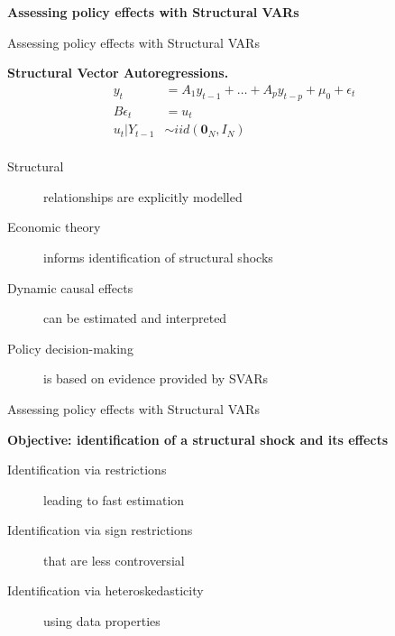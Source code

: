 \documentclass[notes,blackandwhite,mathsans]{beamer}
\begin{document}
{
\begin{frame}

\begin{adjustwidth}{-0.5cm}{0cm}
\vspace{8.3cm}\Large
\textbf{{\color{mcxs3}Assessing policy effects with  } {\color{mcxs1}Structural VARs}}
\end{adjustwidth}

\end{frame}
}





\begin{frame}{Assessing policy effects with Structural VARs}

\textbf{Structural Vector Autoregressions.}
\begin{align*}
y_t &= A_1 y_{t-1} + \dots + A_p y_{t-p}  + \mu_0 + \epsilon_t\\[1ex]
B\epsilon_t &= u_t \\[1ex]
u_t|Y_{t-1} &\sim iid\left(\mathbf{0}_N,I_N\right)\\
\end{align*}

\begin{description}
\item[Structural] {\color{mcxs2}relationships are explicitly modelled} 
\item[Economic theory] {\color{mcxs2}informs identification of structural shocks} 
\item[Dynamic causal effects] {\color{mcxs2}can be estimated and interpreted} 
\item[Policy decision-making] {\color{mcxs2}is based on evidence provided by SVARs}
\end{description}
\end{frame}





\begin{frame}{Assessing policy effects with Structural VARs}

\textbf{Objective: identification of a structural shock and its effects}
\bigskip
\begin{description}
\item[Identification via restrictions] {\color{mcxs2}leading to fast estimation} \\[1ex]
\item[Identification via sign restrictions] {\color{mcxs2}that are less controversial} \\[1ex]
\item[Identification via heteroskedasticity] {\color{mcxs2}using data properties} 
\end{description}
\end{frame}
\end{document}
